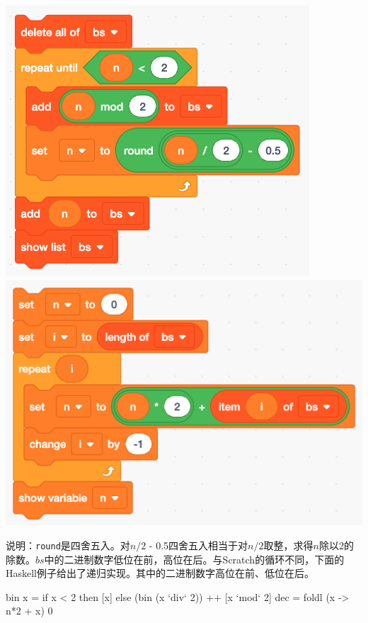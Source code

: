 \documentclass[b5paper]{ctexart}
\begin{document}
\begin{Answer}[ref={ex:numerals}]
{\begin{center}
 \includegraphics[scale=0.3]{img/scratch-bin}
 \qquad
 \includegraphics[scale=0.3]{img/scratch-dec}
 \label{fig:bin-dec-scratch}
\end{center}

说明：\lstinline|round|是四舍五入。对$n/2$ - 0.5四舍五入相当于对$n/2$取整，求得$n$除以2的除数。$bs$中的二进制数字低位在前，高位在后。与Scratch的循环不同，下面的Haskell例子给出了递归实现。其中的二进制数字高位在前、低位在后。

\begin{Haskell}[frame=single]
bin x = if x < 2 then [x] else (bin (x `div` 2)) ++ [x `mod` 2]
dec = foldl (\n x -> n*2 + x) 0
\end{Haskell}
}


\end{Answer}
\end{document}
